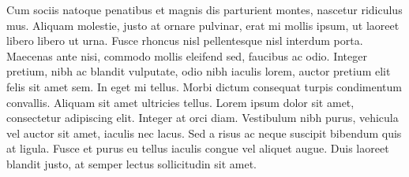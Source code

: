 Cum sociis natoque penatibus et magnis dis parturient montes, nascetur ridiculus mus. Aliquam molestie, justo at ornare pulvinar, erat mi mollis ipsum, ut laoreet libero libero ut urna. Fusce rhoncus nisl pellentesque nisl interdum porta. Maecenas ante nisi, commodo mollis eleifend sed, faucibus ac odio. Integer pretium, nibh ac blandit vulputate, odio nibh iaculis lorem, auctor pretium elit felis sit amet sem. In eget mi tellus. Morbi dictum consequat turpis condimentum convallis. Aliquam sit amet ultricies tellus. Lorem ipsum dolor sit amet, consectetur adipiscing elit. Integer at orci diam. Vestibulum nibh purus, vehicula vel auctor sit amet, iaculis nec lacus. Sed a risus ac neque suscipit bibendum quis at ligula. Fusce et purus eu tellus iaculis congue vel aliquet augue. Duis laoreet blandit justo, at semper lectus sollicitudin sit amet.